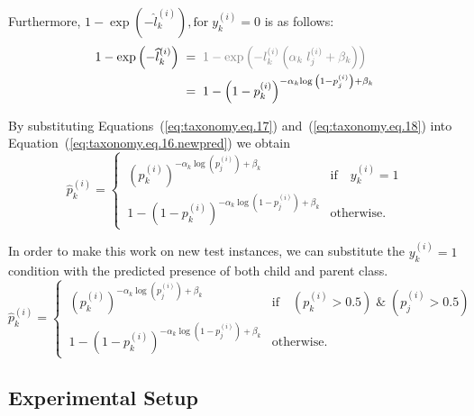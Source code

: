 \documentclass[final,1p,times,authoryear]{elsarticle}
\begin{document}
Furthermore, $1-\exp{\left(-{\widehat l}_k^{(i)}\right)},\text{for}\; y_k^{(i)}=0 $ is as follows:
\begin{align}
    \label{eq:taxonomy.eq.18}
    1-\exp{\left(-{\widehat l}_k^{(i)}\right)}
    & \; = \; \textcolor{gray}{1-\exp{\left(-l_k^{(i)}\left(\alpha_k\;l_j^{(i)}+\beta_k\right)\right)} \nonumber}
    \\
    & \; = \; {1-\left(1-p_k^{(i)}\right)}^{-\alpha_k{\log{\left(1-p_j^{(i)}\right)}}+\beta_k}
\end{align}

By substituting Equations~(\ref{eq:taxonomy.eq.17}) and~(\ref{eq:taxonomy.eq.18})  into Equation~(\ref{eq:taxonomy.eq.16.newpred})  we obtain
\begin{equation}
    \label{eq:taxonomy.eq.19.newpred}
    \widehat{p}_k^{(i)} =
    \begin{cases}
        \, {\left( p_k^{(i)} \right)}^{-\alpha_k \log(p_j^{(i)}) + \beta_k}
        &
        \text{if} \quad y_k^{(i)} = 1
        \\
        \, 1 - {\left( 1 - p_k^{(i)} \right)}^{-\alpha_k \log{\left( 1 - p_j^{(i)} \right)} + \beta_k}
        &
        \text{otherwise.}
    \end{cases}
\end{equation}

In order to make this work on new test instances, we can substitute the $y_{k}^{(i)}=1$ condition with the predicted presence of both child and parent class.
\begin{equation}
    \label{eq:taxonomy.eq.19.newpred_wo_groundtruth}
    \widehat{p}_k^{(i)} =
    \begin{cases}
        \, {\left( p_k^{(i)} \right)}^{-\alpha_k \log(p_j^{(i)}) + \beta_k}
        &
        \text{if} \quad (p_k^{(i)} > 0.5) \; \& \; (p_j^{(i)} > 0.5)
        \\
        \, 1 - {\left( 1 - p_k^{(i)} \right)}^{-\alpha_k \log{\left( 1 - p_j^{(i)} \right)} + \beta_k}
        &
        \text{otherwise.}
    \end{cases}
\end{equation}

\subsection{Experimental Setup}
\end{document}
